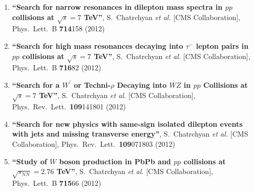 \begin{enumerate}
\item%
{\bf ``Search for narrow resonances in dilepton mass spectra in $pp$ collisions at $\sqrt{s}=7$ TeV''}, 
  S.~Chatrchyan {\it et al.}  [CMS Collaboration], 
Phys.\ Lett.\ B {\bf 714}158 (2012) %


\item%
{\bf ``Search for high mass resonances decaying into $\tau^-$ lepton pairs in $pp$ collisions at $\sqrt{s}=7$ TeV''}, 
  S.~Chatrchyan {\it et al.}  [CMS Collaboration], 
Phys.\ Lett.\ B {\bf 716}82 (2012) %


\item%
{\bf ``Search for a $W^\prime$ or Techni-$\rho$ Decaying into $WZ$ in $pp$ Collisions at $\sqrt{s}=7$ TeV''}, 
  S.~Chatrchyan {\it et al.}  [CMS Collaboration], 
Phys.\ Rev.\ Lett.\  {\bf 109}141801 (2012) %


\item%
{\bf ``Search for new physics with same-sign isolated dilepton events with jets and missing transverse energy''}, 
  S.~Chatrchyan {\it et al.}  [CMS Collaboration], 
Phys.\ Rev.\ Lett.\  {\bf 109}071803 (2012) %


\item%
{\bf ``Study of $W$ boson production in PbPb and $pp$ collisions at $\sqrt{s_{NN}}=2.76$ TeV''}, 
  S.~Chatrchyan {\it et al.}  [CMS Collaboration], 
Phys.\ Lett.\ B {\bf 715}66 (2012) %



\end{enumerate}
